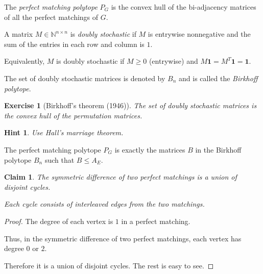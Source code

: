 \documentclass{beamer}
\newtheorem{exercise}{Exercise}
\newtheorem{hint}{Hint}
\newtheorem{claim}{Claim}
\newcommand{\nn}{\mathbb{N}}
\begin{document}
\begin{frame}

  \begin{definitions}
    The \emph{perfect matching polytope} $P_G$ is the convex hull of
    the bi-adjacency matrices of all the perfect matchings of $G$.
  \end{definitions}

  \begin{definitions}
    A matrix $M \in \nn^{n \times n}$ is \emph{doubly stochastic} if
    $M$ is entrywise nonnegative and the sum of the entries in each row
    and column is $1$.

    Equivalently, $M$ is doubly stochastic if $M \ge 0$ (entrywise) and
    $M \mathbf{1} = M^T \mathbf{1} = \mathbf{1}$.

    The set of doubly stochastic matrices is denoted by $B_n$ and is
    called the \emph{Birkhoff polytope}.
  \end{definitions}

  \begin{exercise}[Birkhoff's theorem (1946)]
    The set of doubly stochastic matrices is the convex hull of the
    permutation matrices.
  \end{exercise}

  \begin{hint}
    Use Hall's marriage theorem.
  \end{hint}

  \begin{corollary}
    The perfect matching polytope $P_G$ is exactly the matrices $B$ in
    the Birkhoff polytope $B_n$ such that $B \le A_E$.
  \end{corollary}

  \begin{claim}
    The symmetric difference of two perfect matchings is a union of
    disjoint cycles.

    Each cycle consists of interleaved edges from the two matchings.
  \end{claim}

  \begin{proof}
    The degree of each vertex is $1$ in a perfect matching.

    Thus, in the symmetric difference of two perfect matchings, each
    vertex has degree $0$ or $2$.

    Therefore it is a union of disjoint cycles. The rest is easy to see.
  \end{proof}


\end{frame}
\end{document}

